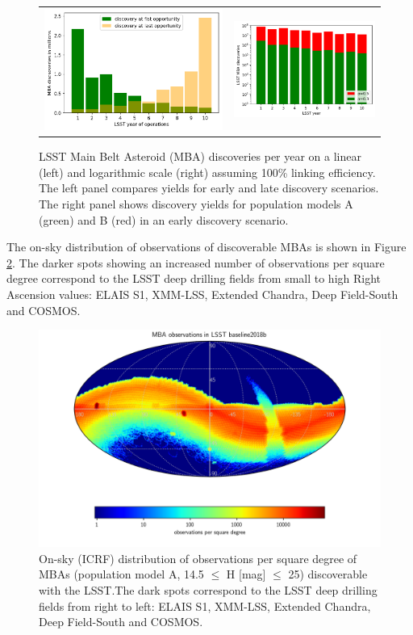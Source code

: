 \begin{figure}[tb!]
\begin{center}
\begin{tabular}{cc}
\includegraphics[width=0.5\linewidth]{figs/discovery_time.png} &
\includegraphics[width=0.5\linewidth]{figs/disc_per_yr2.png}
\end{tabular}
\end{center}
\caption{LSST Main Belt Asteroid (\gls{MBA}) discoveries per year on a linear (left) and logarithmic scale (right) assuming 100\% linking efficiency. The left panel compares yields for early and late discovery scenarios. The right panel shows discovery yields for population models A (green) and \gls{B} (red) in an early discovery scenario.}
\label{fig:mba_disc_yr}       %
\end{figure}
%
The on-sky distribution of observations of discoverable MBAs is shown in Figure \ref{fig:mba_obs_sky}. The darker spots showing an increased number of observations per square degree correspond to the \gls{LSST} deep drilling fields from small to high Right Ascension values: ELAIS S1, \gls{XMM}-LSS, Extended Chandra, Deep Field-South and COSMOS.
\begin{figure}
\begin{center}
\includegraphics[width=0.70\linewidth]{figs/mba_obs_hpmap.png}
\end{center}
\caption{On-sky (ICRF) distribution of observations per square degree of MBAs (population model A, 14.5 $\le$ H [mag] $\le$ 25) discoverable with the \gls{LSST}.The dark spots correspond to the \gls{LSST} deep drilling fields from right to left: ELAIS S1, \gls{XMM}-LSS, Extended Chandra, Deep Field-South and COSMOS.}
\label{fig:mba_obs_sky}       %
\end{figure}
